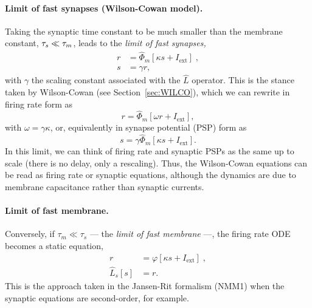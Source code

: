 \documentclass[11pt]{article}
\numberwithin{equation}{section}
\newcommand{\rev}[1]{\begingroup\color{black}#1\endgroup}
\begin{document}
\paragraph{Limit of fast synapses (Wilson-Cowan model).} Taking the synaptic time constant to be much smaller than the membrane constant,  $\tau_s %
\rev{\ll} \tau_m$, leads to the \textit{limit of fast synapses, }
\begin{equation}\label{eq:wilco0}
\begin{aligned}
r &=  \hat \Phi_m [\kappa s +  I_\text{ext}] \;,\\
 s &= \gamma r,
 \end{aligned}
\end{equation}
with $\gamma$ the scaling constant associated with the $\hat L$ operator. This is the stance taken by Wilson-Cowan (see  Section~\ref{sec:WILCO}), which we can rewrite in firing rate form as 
\begin{equation}\label{eq:wilco0-op}
 r =  \hat \Phi_m [\omega r +  I_\text{ext}] ,
\end{equation}
with $\omega= \gamma \kappa$, or, equivalently in synapse potential (PSP) form as
\begin{equation}\label{eq:wilco0-op-s}
 s =  \gamma \hat \Phi_m [\kappa s +  I_\text{ext}].
\end{equation}
In this limit, we can think of firing rate and synaptic PSPs as the same up to scale (there is no delay, only a rescaling). Thus, the Wilson-Cowan equations can be read as firing rate or synaptic equations, although the dynamics are due to membrane capacitance rather than synaptic currents.


 \paragraph{Limit of fast membrane.} Conversely, if \rev{$\tau_m \ll \tau_s$} --- the \textit{limit of fast membrane} ---, the firing rate ODE becomes a static equation,
\begin{equation}
\begin{aligned}
 r  &=  \varphi[\kappa s +  I_\text{ext}] \;,\\
 \hat L_s[s] &=  r.
 \end{aligned}
\end{equation}
This is the approach taken in the Jansen-Rit formalism (NMM1) when the synaptic equations are second-order, for example.
\end{document}
